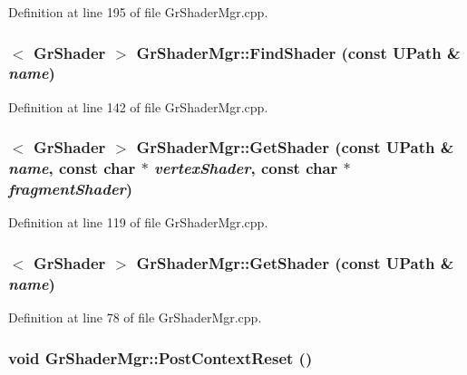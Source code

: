 Definition at line 195 of file GrShaderMgr.cpp.\hypertarget{class_gr_shader_mgr_995feafb4bceced19755f92e010c002c}{
\subsubsection[{FindShader}]{$<$ {\bf GrShader} $>$ GrShaderMgr::FindShader (const {\bf UPath} \& {\em name})}}
\label{class_gr_shader_mgr_995feafb4bceced19755f92e010c002c}




Definition at line 142 of file GrShaderMgr.cpp.\hypertarget{class_gr_shader_mgr_4faff2000dae06eedcfe5c0d355cf4a9}{
\subsubsection[{GetShader}]{$<$ {\bf GrShader} $>$ GrShaderMgr::GetShader (const {\bf UPath} \& {\em name}, \/  const char $\ast$ {\em vertexShader}, \/  const char $\ast$ {\em fragmentShader})}}
\label{class_gr_shader_mgr_4faff2000dae06eedcfe5c0d355cf4a9}




Definition at line 119 of file GrShaderMgr.cpp.\hypertarget{class_gr_shader_mgr_808c8e1152500a452398977b1b1ff650}{
\subsubsection[{GetShader}]{$<$ {\bf GrShader} $>$ GrShaderMgr::GetShader (const {\bf UPath} \& {\em name})}}
\label{class_gr_shader_mgr_808c8e1152500a452398977b1b1ff650}




Definition at line 78 of file GrShaderMgr.cpp.\hypertarget{class_gr_shader_mgr_2d61b25bed57a4bda589fea72d232d37}{
\subsubsection[{PostContextReset}]{\setlength{\rightskip}{0pt plus 5cm}void GrShaderMgr::PostContextReset ()}}
\label{class_gr_shader_mgr_2d61b25bed57a4bda589fea72d232d37}




